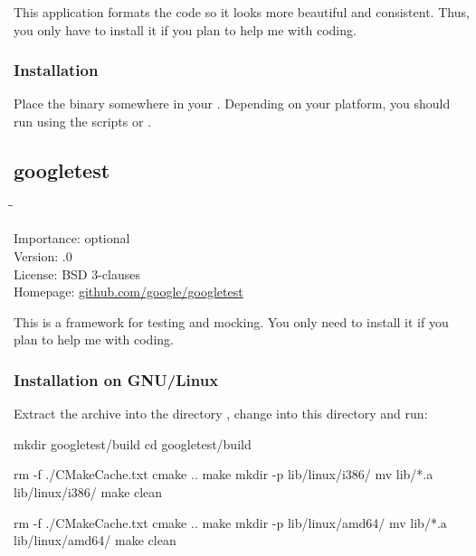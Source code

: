 This application formats the code so it looks more beautiful and
consistent.  Thus, you only have to install it if you plan to help me
with coding.

\subsubsection{Installation}

Place the binary somewhere in your .  Depending on your
platform, you should run  using the scripts
 or .

\subsection{googletest}

\begin{tabbing}
  \hspace*{6em}\=\=\kill

  Importance:  \> optional \\
  Version:     .0 \\
  License:     \> BSD 3-clauses \\
  Homepage:    \> \href{https://github.com/google/googletest}{github.com/google/googletest}
\end{tabbing}

This is a framework for testing and mocking.  You only need to install
it if you plan to help me with coding.

\subsubsection{Installation on GNU/Linux}

Extract the archive into the directory ,
change into this directory and run:

\begin{VerbatimBoth}
  mkdir googletest/build
  cd googletest/build
\end{VerbatimBoth}

\begin{Verbatim32}
  rm -f ./CMakeCache.txt
  cmake ..
  make
  mkdir -p lib/linux/i386/
  mv lib/*.a lib/linux/i386/
  make clean
\end{Verbatim32}

\begin{Verbatim64}
  rm -f ./CMakeCache.txt
  cmake ..
  make
  mkdir -p lib/linux/amd64/
  mv lib/*.a lib/linux/amd64/
  make clean
\end{Verbatim64}

